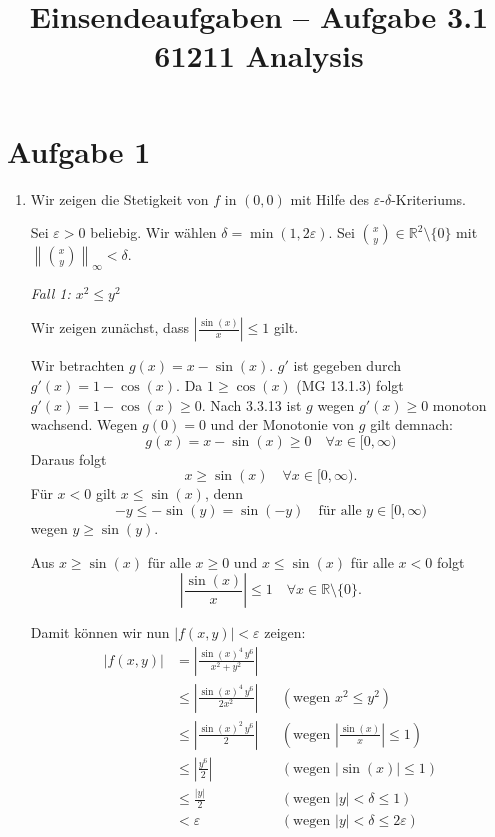 \documentclass[a4paper,12pt]{article}
\title{Einsendeaufgaben -- Aufgabe 3.1\\[0.5em]
\large 61211 Analysis}
\author{}
\date{}
\begin{document}
\maketitle

\section*{Aufgabe 1}

\begin{enumerate}[label=\alph*)]

    \item
    Wir zeigen die Stetigkeit von $f$ in $(0,0)$ mit Hilfe des $\varepsilon$-$\delta$-Kriteriums.

    Sei $\varepsilon > 0$ beliebig. Wir wählen $\delta = \min(1, 2\varepsilon)$.
    Sei $\binom{x}{y} \in \mathbb{R}^2 \setminus \{0\}$ mit $\left\| \binom{x}{y} \right\|_\infty < \delta$.

    \textit{Fall 1: $x^2 \leq y^2$}

    Wir zeigen zunächst, dass $\left| \frac{\sin(x)}{x} \right| \leq 1$ gilt.

    Wir betrachten $g(x) = x - \sin(x)$. $g'$ ist gegeben durch $g'(x) = 1 - \cos(x)$. Da $1 \geq \cos(x)$ (MG 13.1.3) folgt $g'(x) = 1 - \cos(x) \geq 0$. Nach 3.3.13 ist $g$ wegen $g'(x) \geq 0$ monoton wachsend. Wegen $g(0) = 0$ und der Monotonie von $g$ gilt demnach:
    \[
        g(x) = x - \sin(x) \geq 0 \quad \forall x \in [0, \infty)
    \]
    Daraus folgt
    \[
        x \geq \sin(x) \quad \forall x \in [0, \infty).
    \]
    Für $x < 0$ gilt $x \leq \sin(x)$, denn
    \[
        -y \leq -\sin(y) = \sin(-y) \quad \text{für alle } y \in [0, \infty)
    \]
    wegen $y \geq \sin(y)$.

    Aus $x \geq \sin(x)$ für alle $x \geq 0$ und $x \leq \sin(x)$ für alle $x < 0$ folgt
    \[
        \left| \frac{\sin(x)}{x} \right| \leq 1 \quad \forall x \in \mathbb{R} \setminus \{0\}.
    \]

    Damit können wir nun $|f(x,y)| < \varepsilon$ zeigen:
    \begin{align*}
        |f(x,y)| &= \left| \frac{\sin(x)^4 \, y^6}{x^2 + y^2} \right| \\
        &\leq \left| \frac{\sin(x)^4 \, y^6}{2 x^2} \right| && (\text{wegen } x^2 \leq y^2) \\
        &\leq \left| \frac{\sin(x)^2 \, y^6}{2} \right| && \left( \text{wegen } \left| \tfrac{\sin(x)}{x} \right| \leq 1 \right) \\
        &\leq \left| \frac{y^6}{2} \right| && (\text{wegen } |\sin(x)| \leq 1) \\
        &\leq \frac{|y|}{2} && (\text{wegen } |y| < \delta \leq 1) \\
        &< \varepsilon && (\text{wegen } |y| < \delta \leq 2\varepsilon)
    \end{align*}


\end{enumerate}
\end{document}
